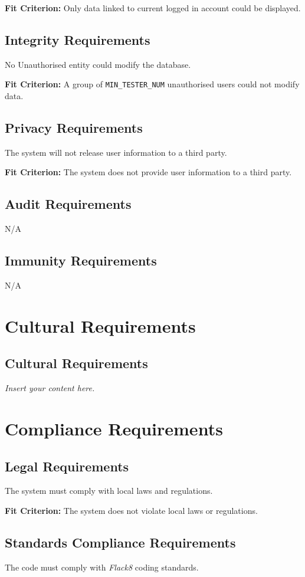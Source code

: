 \documentclass[12pt]{article}
\newcommand{\lips}{\textit{Insert your content here.}}
\begin{document}
\textbf{Fit Criterion:} Only data linked to current logged in account could be displayed.
\subsection{Integrity Requirements}
No Unauthorised entity could modify the database.

\textbf{Fit Criterion:} A group of \texttt{MIN\_TESTER\_NUM} unauthorised users could not modify data.
\subsection{Privacy Requirements}

The system will not release user information to a third party.

\textbf{Fit Criterion:} The system does not provide user information to a third party.
\subsection{Audit Requirements}
N/A
\subsection{Immunity Requirements}
N/A

\section{Cultural Requirements}
\subsection{Cultural Requirements}
\lips

\section{Compliance Requirements}
\subsection{Legal Requirements}
The system must comply with local laws and regulations.

\textbf{Fit Criterion:} The system does not violate local laws or regulations.
\subsection{Standards Compliance Requirements}
The code must comply with \textit{Flack8} coding standards.
\end{document}
